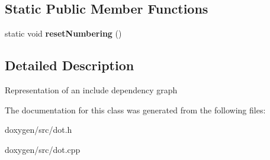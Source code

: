 \subsection*{Static Public Member Functions}
\begin{DoxyCompactItemize}
\item 
\mbox{\label{class_dot_incl_dep_graph_a189d47564a5ab4d0498908fcc8f31260}} 
static void {\bfseries reset\+Numbering} ()
\end{DoxyCompactItemize}


\subsection{Detailed Description}
Representation of an include dependency graph 

The documentation for this class was generated from the following files\+:\begin{DoxyCompactItemize}
\item 
doxygen/src/dot.\+h\item 
doxygen/src/dot.\+cpp\end{DoxyCompactItemize}
